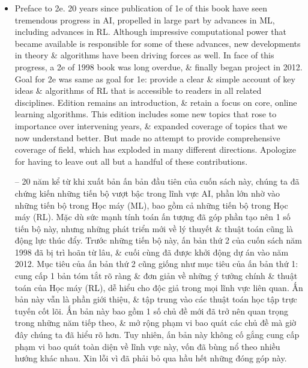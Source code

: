 \documentclass{article}
\begin{document}
\begin{itemize}
    \item {\sf Preface to 2e.} 20 years since publication of 1e of this book have seen tremendous progress in AI, propelled in large part by advances in ML, including advances in RL. Although impressive computational power that became available is responsible for some of these advances, new developments in theory \& algorithms have been driving forces as well. In face of this progress, a 2e of 1998 book was long overdue, \& finally began project in 2012. Goal for 2e was same as goal for 1e: provide a clear \& simple account of key ideas \& algorithms of RL that is accessible to readers in all related disciplines. Edition remains an introduction, \& retain a focus on core, online learning algorithms. This edition includes some new topics that rose to importance over intervening years, \& expanded coverage of topics that we now understand better. But made no attempt to provide comprehensive coverage of field, which has exploded in many different directions. Apologize for having to leave out all but a handful of these contributions.

    -- 20 năm kể từ khi xuất bản ấn bản đầu tiên của cuốn sách này, chúng ta đã chứng kiến những tiến bộ vượt bậc trong lĩnh vực AI, phần lớn nhờ vào những tiến bộ trong Học máy (ML), bao gồm cả những tiến bộ trong Học máy (RL). Mặc dù sức mạnh tính toán ấn tượng đã góp phần tạo nên 1 số tiến bộ này, nhưng những phát triển mới về lý thuyết \& thuật toán cũng là động lực thúc đẩy. Trước những tiến bộ này, ấn bản thứ 2 của cuốn sách năm 1998 đã bị trì hoãn từ lâu, \& cuối cùng đã được khởi động dự án vào năm 2012. Mục tiêu của ấn bản thứ 2 cũng giống như mục tiêu của ấn bản thứ 1: cung cấp 1 bản tóm tắt rõ ràng \& đơn giản về những ý tưởng chính \& thuật toán của Học máy (RL), dễ hiểu cho độc giả trong mọi lĩnh vực liên quan. Ấn bản này vẫn là phần giới thiệu, \& tập trung vào các thuật toán học tập trực tuyến cốt lõi. Ấn bản này bao gồm 1 số chủ đề mới đã trở nên quan trọng trong những năm tiếp theo, \& mở rộng phạm vi bao quát các chủ đề mà giờ đây chúng ta đã hiểu rõ hơn. Tuy nhiên, ấn bản này không cố gắng cung cấp phạm vi bao quát toàn diện về lĩnh vực này, vốn đã bùng nổ theo nhiều hướng khác nhau. Xin lỗi vì đã phải bỏ qua hầu hết những đóng góp này.


\end{itemize}
\end{document}
